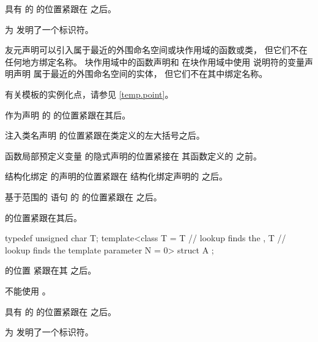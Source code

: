 \pnum
具有  的 
的位置紧跟在  之后。
\begin{note}
为 
发明了一个标识符。
\end{note}

\pnum
\begin{note}
友元声明可以引入属于最近的外围命名空间或块作用域的函数或类，
但它们不在任何地方绑定名称。
块作用域中的函数声明和
在块作用域中使用  说明符的变量声明声明
属于最近的外围命名空间的实体，
但它们不在其中绑定名称。
\end{note}

\pnum
\begin{note}
有关模板的实例化点，请参见 \ref{temp.point}。
\end{note}

\pnum
作为声明 的 
的位置紧跟在其后。

\pnum
注入类名声明
的位置紧跟在类定义的左大括号之后。

\pnum
函数局部预定义变量
的隐式声明的位置紧接在
其函数定义的  之前。

\pnum
结构化绑定
的声明的位置紧跟在
结构化绑定声明的  之后。

\pnum
基于范围的  语句 的 
的位置紧跟在  之后。

\pnum
{} 的位置紧跟在其后。
\begin{example}
\begin{codeblock}
typedef unsigned char T;
template<class T
  = T               // lookup finds the 
  , T               // lookup finds the template parameter
    N = 0> struct A { };
\end{codeblock}
\end{example}

\pnum
{} 的位置
紧跟在其  之后。
\begin{note}
 不能使用
。
\end{note}

\pnum
具有  的 
的位置紧跟在  之后。
\begin{note}
为 
发明了一个标识符。
\end{note}

